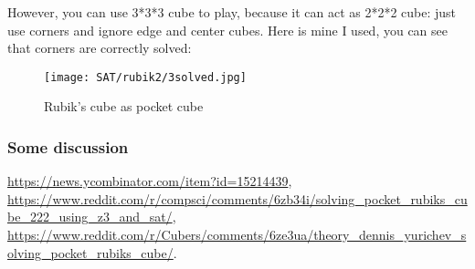 However, you can use 3*3*3 cube to play, because it can act as 2*2*2 cube: just use corners and ignore
edge and center cubes.
Here is mine I used, you can see that corners are correctly solved:

\begin{figure}[H]
\centering
\texttt{[image: SAT/rubik2/3solved.jpg]}
\caption{Rubik's cube as pocket cube}
\end{figure}

\subsubsection{Some discussion}

\url{https://news.ycombinator.com/item?id=15214439},\\
\url{https://www.reddit.com/r/compsci/comments/6zb34i/solving_pocket_rubiks_cube_222_using_z3_and_sat/},\\
\url{https://www.reddit.com/r/Cubers/comments/6ze3ua/theory_dennis_yurichev_solving_pocket_rubiks_cube/}.

